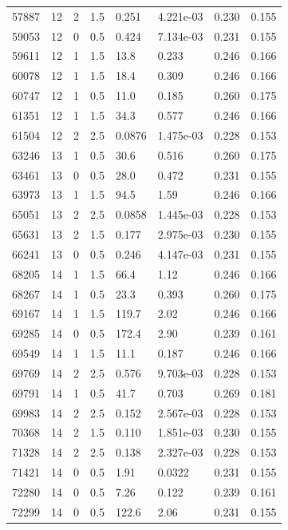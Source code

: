 \documentclass[preview]{standalone}
\begin{document}
{{{\begin{tabular}{L{1.2cm}C{1.2cm} C{0.3cm}C{0.5cm} C{1.4cm}C{1.4cm} C{1.4cm}C{1.4cm}}
  57887  &    12  & 2     & 1.5 &  0.251  & 4.221e-03  & 0.230 &  0.155   \\ 
  59053  &    12  & 0     & 0.5 &  0.424  & 7.134e-03  & 0.231 &  0.155   \\ 
  59611  &    12  & 1     & 1.5 &  13.8  & 0.233  & 0.246 &  0.166   \\ 
  60078  &    12  & 1     & 1.5 &  18.4  & 0.309  & 0.246 &  0.166   \\ 
  60747  &    12  & 1     & 0.5 &  11.0  & 0.185  & 0.260 &  0.175   \\ 
  61351  &    12  & 1     & 1.5 &  34.3  & 0.577  & 0.246 &  0.166   \\ 
  61504  &    12  & 2     & 2.5 &  0.0876  & 1.475e-03  & 0.228 &  0.153   \\ 
  63246  &    13  & 1     & 0.5 &  30.6  & 0.516  & 0.260 &  0.175   \\ 
  63461  &    13  & 0     & 0.5 &  28.0  & 0.472  & 0.231 &  0.155   \\ 
  63973  &    13  & 1     & 1.5 &  94.5  & 1.59  & 0.246 &  0.166   \\ 
  65051  &    13  & 2     & 2.5 &  0.0858  & 1.445e-03  & 0.228 &  0.153   \\ 
  65631  &    13  & 2     & 1.5 &  0.177  & 2.975e-03  & 0.230 &  0.155   \\ 
  66241  &    13  & 0     & 0.5 &  0.246  & 4.147e-03  & 0.231 &  0.155   \\ 
  68205  &    14  & 1     & 1.5 &  66.4  & 1.12  & 0.246 &  0.166   \\ 
  68267  &    14  & 1     & 0.5 &  23.3  & 0.393  & 0.260 &  0.175   \\ 
  69167  &    14  & 1     & 1.5 &  119.7  & 2.02  & 0.246 &  0.166   \\ 
  69285  &    14  & 0     & 0.5 &  172.4  & 2.90  & 0.239 &  0.161   \\ 
  69549  &    14  & 1     & 1.5 &  11.1  & 0.187  & 0.246 &  0.166   \\ 
  69769  &    14  & 2     & 2.5 &  0.576  & 9.703e-03  & 0.228 &  0.153   \\ 
  69791  &    14  & 1     & 0.5 &  41.7  & 0.703  & 0.269 &  0.181   \\ 
  69983  &    14  & 2     & 2.5 &  0.152  & 2.567e-03  & 0.228 &  0.153   \\ 
  70368  &    14  & 2     & 1.5 &  0.110  & 1.851e-03  & 0.230 &  0.155   \\ 
  71328  &    14  & 2     & 2.5 &  0.138  & 2.327e-03  & 0.228 &  0.153   \\ 
  71421  &    14  & 0     & 0.5 &  1.91  & 0.0322  & 0.231 &  0.155   \\ 
  72280  &    14  & 0     & 0.5 &  7.26  & 0.122  & 0.239 &  0.161   \\ 
  72299  &    14  & 0     & 0.5 &  122.6  & 2.06  & 0.231 &  0.155   \\ 
\hline 
\end{tabular} 

}}}
\end{document}
